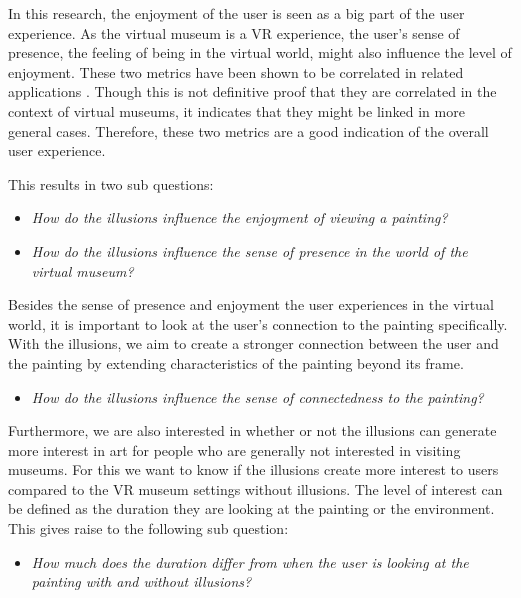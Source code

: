 \documentclass[a4paper]{article}
\begin{document}
In this research, the enjoyment of the user is seen as a big part of the user experience. As the virtual museum is a VR experience, the user's sense of presence, the feeling of being in the virtual world, might also influence the level of enjoyment. These two metrics have been shown to be correlated in related applications \cite{sylaiou}. Though this is not definitive proof that they are correlated in the context of virtual museums, it indicates that they might be linked in more general cases. Therefore, these two metrics are a good indication of the overall user experience.

This results in two sub questions:

\begin{itemize}
\item{\emph{How do the illusions influence the enjoyment of viewing a painting?}}
\end{itemize}

\begin{itemize}
\item{\emph{How do the illusions influence the sense of presence in the world of the virtual museum?}}
\end{itemize}

Besides the sense of presence and enjoyment the user experiences in the virtual world, it is important to look at the user’s connection to the painting specifically. With the illusions, we aim to create a stronger connection between the user and the painting by extending characteristics of the painting beyond its frame. 

\begin{itemize}
\item{\emph{How do the illusions influence the sense of connectedness to the painting?}}
\end{itemize}

Furthermore, we are also interested in whether or not the illusions can generate more interest in art for people who are generally not interested in visiting museums. For this we want to know if the illusions create more interest to users compared to the VR museum settings without illusions. The level of interest can be defined as the duration they are looking at the painting or the environment. This gives raise to the following sub question:

\begin{itemize}
\item{\emph{How much does the duration differ from when the user is looking at the painting with and without illusions?}}
\end{itemize}
\end{document}
